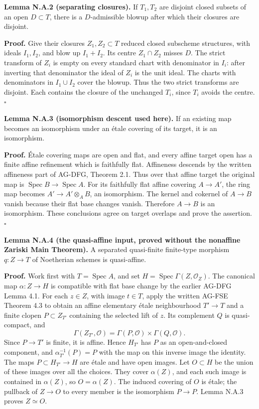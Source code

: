 \documentclass[11pt]{article}
\begin{document}
\textbf{Lemma N.A.2 (separating closures).} If \(T_1,T_2\) are disjoint
closed subsets of an open \(D\subset T\), there is a \(D\)-admissible
blowup after which their closures are disjoint.

\textbf{Proof.} Give their closures \(Z_1,Z_2\subset T\) reduced closed
subscheme structures, with ideals \(I_1,I_2\), and blow up \(I_1+I_2\).
Its centre \(Z_1\cap Z_2\) misses \(D\). The strict transform of \(Z_i\)
is empty on every standard chart with denominator in \(I_i\): after
inverting that denominator the ideal of \(Z_i\) is the unit ideal. The
charts with denominators in \(I_1\cup I_2\) cover the blowup. Thus the
two strict transforms are disjoint. Each contains the closure of the
unchanged \(T_i\), since \(T_i\) avoids the centre. \(\square\)

\textbf{Lemma N.A.3 (isomorphism descent used here).} If an existing map
becomes an isomorphism under an étale covering of its target, it is an
isomorphism.

\textbf{Proof.} Étale covering maps are open and flat, and every affine
target open has a finite affine refinement which is faithfully flat.
Affineness descends by the written affineness part of AG-DFG, Theorem
2.1. Thus over that affine target the original map is
\(\operatorname{Spec}B\to\operatorname{Spec}A\). For its faithfully flat
affine covering \(A\to A'\), the ring map becomes
\(A'\to A'\otimes_A B\), an isomorphism. The kernel and cokernel of
\(A\to B\) vanish because their flat base changes vanish. Therefore
\(A\to B\) is an isomorphism. These conclusions agree on target overlaps
and prove the assertion. \(\square\)

\textbf{Lemma N.A.4 (the quasi-affine input, proved without the
nonaffine Zariski Main Theorem).} A separated quasi-finite finite-type
morphism \(q:Z\to T\) of Noetherian schemes is quasi-affine.

\textbf{Proof.} Work first with \(T=\operatorname{Spec}A\), and set
\(H=\operatorname{Spec}\Gamma(Z,\mathcal O_Z)\). The canonical map
\(\alpha:Z\to H\) is compatible with flat base change by the earlier
AG-DFG Lemma 4.1. For each \(z\in Z\), with image \(t\in T\), apply the
written AG-FSE Theorem 4.3 to obtain an affine elementary étale
neighbourhood \(T'\to T\) and a finite clopen \(P\subset Z_{T'}\)
containing the selected lift of \(z\). Its complement \(Q\) is
quasi-compact, and \[
\Gamma(Z_{T'},\mathcal O)=\Gamma(P,\mathcal O)\times\Gamma(Q,\mathcal O).
\] Since \(P\to T'\) is finite, it is affine. Hence \(H_{T'}\) has \(P\)
as an open-and-closed component, and \(\alpha_{T'}^{-1}(P)=P\) with the
map on this inverse image the identity. The maps
\(P\subset H_{T'}\to H\) are étale and have open images. Let
\(O\subset H\) be the union of these images over all the choices. They
cover \(\alpha(Z)\), and each such image is contained in \(\alpha(Z)\),
so \(O=\alpha(Z)\). The induced covering of \(O\) is étale; the pullback
of \(Z\to O\) to every member is the isomorphism \(P\to P\). Lemma N.A.3
proves \(Z\simeq O\).
\end{document}
